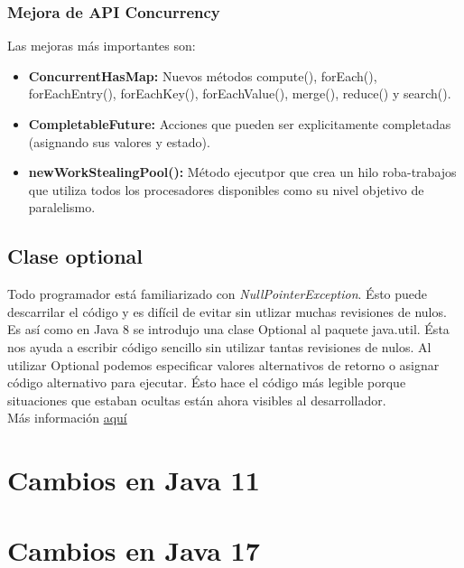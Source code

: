 \documentclass[12pt,article,oneside]{memoir}
\begin{document}
				\subsubsection{Mejora de API Concurrency}
				
				Las mejoras m\'as importantes son:
				\begin{itemize}
					\item \textbf{ConcurrentHasMap:} Nuevos m\'etodos compute(), forEach(), forEachEntry(), forEachKey(), 
					forEachValue(), merge(), reduce() y search().
					\item \textbf{CompletableFuture:} Acciones que pueden ser explicitamente completadas (asignando sus valores 
					y estado).
					\item \textbf{newWorkStealingPool():} M\'etodo ejecutpor que crea un hilo roba-trabajos que utiliza todos los procesadores disponibles como su nivel objetivo de paralelismo.
				\end{itemize}
				
			\subsection{Clase optional}
			
			Todo programador est\'a familiarizado con \textit{NullPointerException}. \'Esto puede descarrilar el c\'odigo y es 
			dif\'icil de evitar sin utlizar muchas revisiones de nulos. Es as\'i como en Java 8 se introdujo una clase Optional 
			al paquete java.util. \'Esta nos ayuda a escribir c\'odigo sencillo sin utilizar tantas revisiones de nulos. Al 
			utilizar Optional podemos especificar valores alternativos de retorno o asignar c\'odigo alternativo para ejecutar. 
			\'Esto hace el c\'odigo m\'as legible porque situaciones que estaban ocultas est\'an ahora visibles al 
			desarrollador.\\
			
			M\'as informaci\'on \href{https://www.geeksforgeeks.org/java-8-optional-class/}{aqu\'i}\\
			
			\newpage
	
		\section{Cambios en Java 11}
		\newpage
	
		\section{Cambios en Java 17}
		\newpage
			
\end{document}
